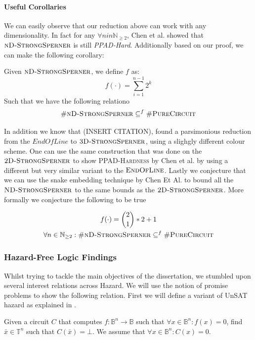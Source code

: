 \paragraph*{Useful Corollaries}
We can easily observe that our reduction above can work with any dimensionality.
In fact for any $\forall n in \mathbb{N}_{\geq 2}$, Chen et al. showed that
$\textsc{nD-StrongSperner}$ is still \textit{PPAD-Hard}. Additionally based on our proof, 
we can make the following corollary:

\begin{corollary}
Given $\textnormal{\textsc{nD-StrongSperner}}$, we define $f$ as:
$$
f(\cdot) = \sum_{i = 1}^{n - 1}2^k
$$
Such that we have the following relationo
$$
\textnormal{\textsc{\#nD-StrongSperner}} \subseteq^f \textnormal{\textsc{\#PureCircuit}}
$$
\end{corollary}

In addition we know that (INSERT CITATION), found a parsimonious
reduction from the $\textit{EndOfLine}$  to $\textnormal{\textsc{3D-StrongSperner}}$,
using a slighgly different colour scheme. One can use the same construction
that was done on the $\textnormal{\textsc{2D-StrongSperner}}$ to show \textsc{PPAD-Hardness}
by Chen et al. by using a different but very similar variant to the $\textsc{EndOfLine}$.
Lastly we conjecture that we can use the snake embedding technique by Chen Et Al. to bound
all the $\textnormal{\textsc{ND-StrongSperner}}$ to the same bounds as the $\textnormal{\textsc{2D-StrongSperner}}$.
More formally we conjecture the following to be true

\begin{conjecture}
\begin{gather*}
    f(\cdot) = \binom{2}{1} * 2 + 1 \\
    \forall n \in \mathbb{N}_{\geq 2} : \textnormal{\textsc{\#nD-StrongSperner}} \subseteq^f \textnormal{\textsc{\#PureCircuit}}  
\end{gather*}
\end{conjecture}

\subsubsection{Hazard-Free Logic Findings}

Whilst trying to tackle the main objectives of the dissertation, we stumbled upon
several interest relations across Hazard. We will use the notion of
promise problems to show the following relation. First we will
define a variant of UnSAT hazard as explained in \cite{ikenmeyerComplexityHazardfreeCircuits2019}.

\begin{definition}
    Given a circuit $C$ that computes $f : \mathbb{B}^n \to \mathbb{B}$ such that
    $\forall x \in \mathbb{B}^n : f(x) = 0$, find $\bar{x} \in \mathbb{T}^n$ such that
    $C(\bar{x}) = \bot$. We assume that $\forall x \in \mathbb{B}^n: C(x) = 0$.
\end{definition}

